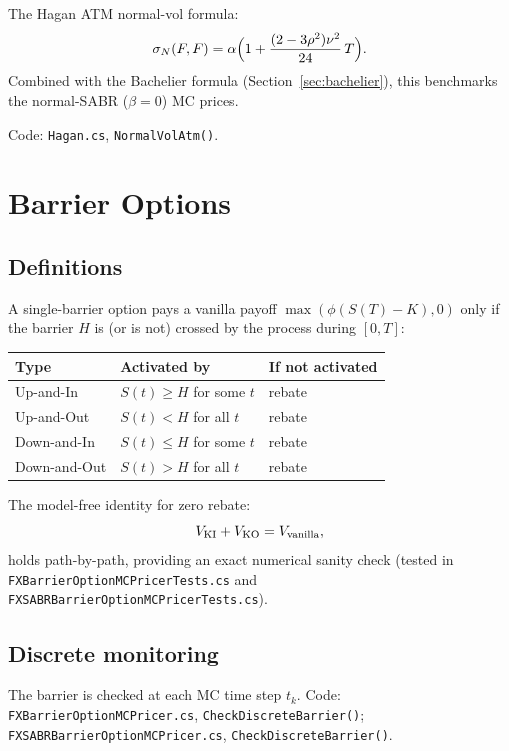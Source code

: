\documentclass[11pt,a4paper]{article}
\newcommand{\coderef}[1]{\texttt{\color{blue!60!black}#1}}
\theoremstyle{definition}
\begin{document}
The Hagan ATM normal-vol formula:
\[
  \sigma_N(F,F) = \alpha\Bigl(1+\frac{(2-3\rho^2)\nu^2}{24}\,T\Bigr).
\]
Combined with the Bachelier formula (Section~\ref{sec:bachelier}), this
benchmarks the normal-SABR ($\beta=0$) MC prices.

Code: \coderef{Hagan.cs}, \texttt{NormalVolAtm()}.

\section{Barrier Options}
\label{sec:barrier}

\subsection{Definitions}

A single-barrier option pays a vanilla payoff $\max(\phi(S(T)-K),0)$ only
if the barrier $H$ is (or is not) crossed by the process during $[0,T]$:
\begin{center}
\begin{tabular}{lll}\toprule
Type & Activated by & If not activated\\\midrule
Up-and-In   & $S(t)\geq H$ for some $t$ & rebate\\
Up-and-Out  & $S(t)< H$ for all $t$ & rebate\\
Down-and-In & $S(t)\leq H$ for some $t$ & rebate\\
Down-and-Out& $S(t)>H$ for all $t$  & rebate\\\bottomrule
\end{tabular}
\end{center}

The model-free identity for zero rebate:
\[
  V_{\rm KI} + V_{\rm KO} = V_{\rm vanilla},
\]
holds path-by-path, providing an exact numerical sanity check (tested in
\coderef{FXBarrierOptionMCPricerTests.cs} and
\coderef{FXSABRBarrierOptionMCPricerTests.cs}).

\subsection{Discrete monitoring}

The barrier is checked at each MC time step $t_k$.  Code:
\coderef{FXBarrierOptionMCPricer.cs}, \texttt{CheckDiscreteBarrier()};
\coderef{FXSABRBarrierOptionMCPricer.cs}, \texttt{CheckDiscreteBarrier()}.
\end{document}
